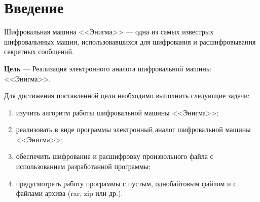 \chapter*{Введение}

Шифровальная машина <<Энигма>> --- одна из самых известрых шифровальнных машин, использовавшихся для шифрования и расшифровывания секретных сообщений.

\textbf{Цель} --- Реализация электронного аналога шифровальной машины <<Энигма>>.

Для достижения поставленной цели необходимо выполнить следующие задачи:
\begin{enumerate}[label=\arabic*)]
    \item изучить алгоритм работы шифровальной машины <<Энигма>>;
    \item реализовать в виде программы электронный аналог шифровальной машины <<Энигма>>;
    \item обеспечить шифрование и расшифровку произвольного файла с использованием разработанной программы;
    \item предусмотреть работу программы с пустым, однобайтовым файлом и с файлами архива (rar, zip или др.).
\end{enumerate}

